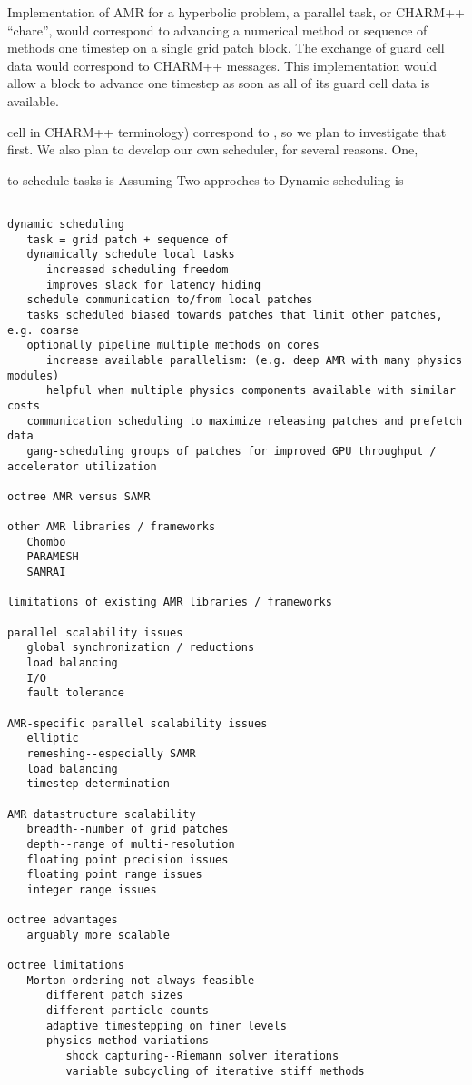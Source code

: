\documentclass[14pt,letter]{article}
\begin{document}
Implementation of AMR for a hyperbolic problem, a parallel task, or CHARM++ ``chare'',
would correspond to advancing a numerical method or sequence of
methods one timestep on a single grid patch block.  The exchange of
guard cell data would correspond to CHARM++ messages.  This
implementation would allow a block to advance one timestep as soon as
all of its guard cell data is available.



cell 
in CHARM++ terminology) correspond to , so we plan to investigate that first.  We also plan to develop
our own scheduler, for several reasons.  One, 

to schedule tasks is 
Assuming 
Two approches to Dynamic scheduling is

\begin{verbatim}

dynamic scheduling
   task = grid patch + sequence of 
   dynamically schedule local tasks
      increased scheduling freedom
      improves slack for latency hiding
   schedule communication to/from local patches
   tasks scheduled biased towards patches that limit other patches, e.g. coarse
   optionally pipeline multiple methods on cores
      increase available parallelism: (e.g. deep AMR with many physics modules)
      helpful when multiple physics components available with similar costs
   communication scheduling to maximize releasing patches and prefetch data
   gang-scheduling groups of patches for improved GPU throughput / accelerator utilization

octree AMR versus SAMR   

other AMR libraries / frameworks
   Chombo
   PARAMESH
   SAMRAI

limitations of existing AMR libraries / frameworks

parallel scalability issues
   global synchronization / reductions
   load balancing
   I/O
   fault tolerance

AMR-specific parallel scalability issues
   elliptic
   remeshing--especially SAMR
   load balancing
   timestep determination

AMR datastructure scalability
   breadth--number of grid patches
   depth--range of multi-resolution
   floating point precision issues
   floating point range issues
   integer range issues

octree advantages
   arguably more scalable

octree limitations
   Morton ordering not always feasible
      different patch sizes
      different particle counts
      adaptive timestepping on finer levels
      physics method variations
         shock capturing--Riemann solver iterations
         variable subcycling of iterative stiff methods


\end{verbatim}
\end{document}
